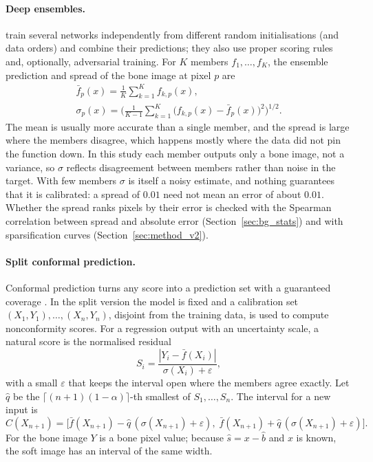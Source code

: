 \paragraph{Deep ensembles.} \citet{lakshminarayanan2017ensembles} train several networks independently from different random initialisations
(and data orders) and combine their predictions; they also use proper scoring rules and, optionally, adversarial training. For $K$ members
$f_1,\dots,f_K$, the ensemble prediction and spread of the bone image at pixel $p$ are
\begin{equation}
\begin{gathered}
\bar f_p(x)=\frac1K\sum_{k=1}^{K}f_{k,p}(x),\\
\sigma_p(x)=\Big(\frac{1}{K-1}\sum_{k=1}^{K}\big(f_{k,p}(x)-\bar f_p(x)\big)^2\Big)^{1/2}.
\end{gathered}
\label{eq:bg_ensemble}
\end{equation}
The mean is usually more accurate than a single member, and the spread is large where the members disagree, which happens mostly where the data
did not pin the function down. In this study each member outputs only a bone image, not a variance, so $\sigma$ reflects disagreement between
members rather than noise in the target. With few members $\sigma$ is itself a noisy estimate, and nothing guarantees that it is calibrated: a
spread of $0.01$ need not mean an error of about $0.01$. Whether the spread ranks pixels by their error is checked with the Spearman correlation
between spread and absolute error (Section~\ref{sec:bg_stats}) and with sparsification curves (Section~\ref{sec:method_v2}).

\paragraph{Split conformal prediction.} Conformal prediction turns any score into a prediction set with a guaranteed coverage
\citep{lei2018conformal,angelopoulos2023conformal}. In the split version the model is fixed and a calibration set
$(X_1,Y_1),\dots,(X_n,Y_n)$, disjoint from the training data, is used to compute nonconformity scores. For a regression output with an
uncertainty scale, a natural score is the normalised residual
\begin{equation}
S_i=\frac{|Y_i-\bar f(X_i)|}{\sigma(X_i)+\varepsilon},
\label{eq:bg_score}
\end{equation}
with a small $\varepsilon$ that keeps the interval open where the members agree exactly. Let $\hat q$ be the
$\lceil (n+1)(1-\alpha)\rceil$-th smallest of $S_1,\dots,S_n$. The interval for a new input is
\begin{equation}
C(X_{n+1})=\big[\bar f(X_{n+1})-\hat q\,(\sigma(X_{n+1})+\varepsilon),\;\bar f(X_{n+1})+\hat q\,(\sigma(X_{n+1})+\varepsilon)\big].
\label{eq:bg_conformal}
\end{equation}
For the bone image $Y$ is a bone pixel value; because $\hat s=x-\hat b$ and $x$ is known, the soft image has an interval of the same width.

